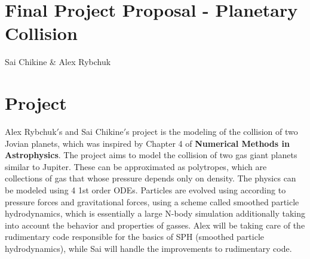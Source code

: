 \documentclass[12pt]{article}
\newcommand{\pdfgraphics}{\ifpdf\DeclareGraphicsExtensions{.pdf,.jpg}\else\fi}
\begin{document}

\section*{Final Project Proposal - Planetary Collision}  %

\medskip
\noindent %
Sai Chikine \& Alex Rybchuk

\section{Project}  
Alex Rybchuk$'$s and Sai Chikine$'$s project is the modeling of the collision of two Jovian planets, which was inspired by Chapter 4 of \textbf{Numerical Methods in Astrophysics}. The project aims to model the collision of two gas giant planets similar to Jupiter. These can be approximated as polytropes, which are collections of gas that whose pressure depends only on density. The physics can be modeled using 4 1st order ODEs. Particles are evolved using according to pressure forces and gravitational forces, using a scheme called smoothed particle hydrodynamics, which is essentially a large N-­body simulation additionally taking into account the behavior and properties of gasses. Alex will be taking care of the rudimentary code responsible for the basics of SPH (smoothed particle hydrodynamics), while Sai will handle the improvements to rudimentary code.
\end{document}
